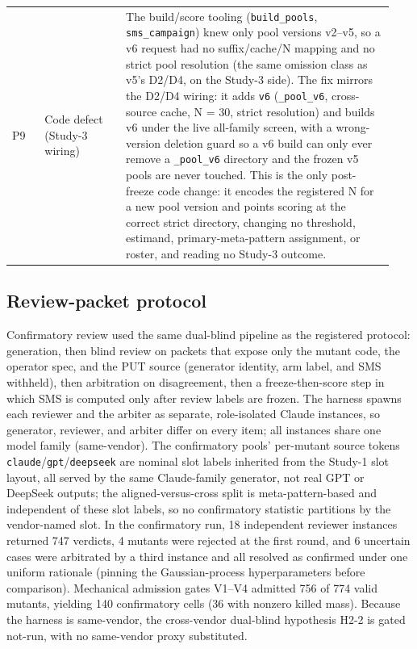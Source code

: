 \documentclass[manuscript,screen,review]{acmart}
\begin{document}
{\begin{longtable}[]{@{}p{0.08\linewidth}p{0.20\linewidth}p{0.66\linewidth}@{}}
P9 & Code defect (Study-3 wiring) & The build/score tooling (\texttt{build\_pools}, \texttt{sms\_campaign}) knew only pool versions v2--v5, so a v6 request had no suffix/cache/N mapping and no strict pool resolution (the same omission class as v5's D2/D4, on the Study-3 side). The fix mirrors the D2/D4 wiring: it adds \texttt{v6} (\texttt{\_pool\_v6}, cross-source cache, N = 30, strict resolution) and builds v6 under the live all-family screen, with a wrong-version deletion guard so a v6 build can only ever remove a \texttt{\_pool\_v6} directory and the frozen v5 pools are never touched. This is the only post-freeze code change: it encodes the registered N for a new pool version and points scoring at the correct strict directory, changing no threshold, estimand, primary-meta-pattern assignment, or roster, and reading no Study-3 outcome. \\
\end{longtable}
\normalsize
}

\subsection{Review-packet protocol}\label{j.5-packet-protocol}

Confirmatory review used the same dual-blind pipeline as the registered
protocol: generation, then blind review on packets that expose only the
mutant code, the operator spec, and the PUT source (generator identity,
arm label, and SMS withheld), then arbitration on disagreement, then a
freeze-then-score step in which SMS is computed only after review labels
are frozen. The harness spawns each reviewer and the arbiter as separate,
role-isolated Claude instances, so generator, reviewer, and arbiter
differ on every item; all instances share one model family (same-vendor).
The confirmatory pools' per-mutant source tokens
\texttt{claude}/\texttt{gpt}/\texttt{deepseek} are nominal slot labels
inherited from the Study-1 slot layout, all served by the same
Claude-family generator, not real GPT or DeepSeek outputs; the
aligned-versus-cross split is meta-pattern-based and independent of these
slot labels, so no confirmatory statistic partitions by the vendor-named
slot.
In the confirmatory run, 18 independent reviewer instances returned 747
verdicts, 4 mutants were rejected at the first round, and 6 uncertain
cases were arbitrated by a third instance and all resolved as confirmed
under one uniform rationale (pinning the Gaussian-process hyperparameters
before comparison). Mechanical admission gates V1--V4 admitted 756 of 774
valid mutants, yielding 140 confirmatory cells (36 with nonzero killed
mass). Because the harness is same-vendor, the cross-vendor dual-blind
hypothesis H2-2 is gated not-run, with no same-vendor proxy substituted.
\end{document}
